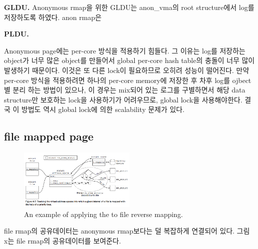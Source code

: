 

\noindent
\textbf{GLDU.} 
Anonymous rmap을 위한 GLDU는 anon\_vma의 root structure에서 log를 저장하도록 하였다. 
anon rmap은 


\noindent
\textbf{PLDU.} 


Anonymous page에는 per-core 방식을 적용하기 힘들다.
그 이유는 log를 저장하는 object가 너무 많은 object를 만들어서 global per-core hash table의 충돌이 너무 많이
발생하기 때문이다. 
이것은 또 다른 lock이 필요하므로 오히려 성능이 떨어진다. 
만약 per-core 방식을 적용하려면 하나의 per-core memory에 저장한 후 차후 log를 ojbect별 분리 하는 방법이 있으나, 
이 경우는  mix되어 있는 로그를 구별하면서 해당 data structure만 보호하는 lock을 사용하기가 어려우므로, global
lock을 사용해야한다.
결국 이 방법도 역시 global lock에 의한 scalability 문제가 있다.


\subsection{file mapped page}

\begin{figure}[tb]
  \begin{center}
     \includegraphics[width=0.5\textwidth,height=0.5\textheight,keepaspectratio]{fig/anon_vma_sample}
  \end{center}
  \caption{An example of applying the  to file reverse mapping. }
  \label{fig:deferu}
\end{figure}
file rmap의 공유데이터는 anonymous rmap보다는 덜 복잡하게 연결되어 있다.
그림 x는 file rmap의 공유데이터를 보여준다. 



